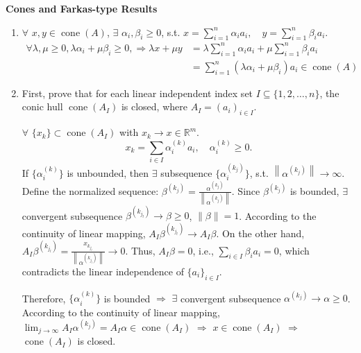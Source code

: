 \documentclass[11pt,letter,notitlepage]{article}
\theoremstyle{definition}
\begin{document}
\newpage

    \begin{solution}\textbf{Cones and Farkas-type Results}
        \begin{enumerate}[label=(\arabic*)]
            \item 
            $\forall$ $x,y \in \operatorname{cone}(A)$, $
            \exists$ $\alpha_i, \beta_i \geq 0$, s.t. $x = \sum_{i=1}^n \alpha_i a_i, \quad y = \sum_{i=1}^n \beta_i a_i$.
            \begin{align*}
            \forall \lambda, \mu \geq 0,
            \lambda \alpha_i + \mu \beta_i \geq 0,
            \Longrightarrow
            \lambda x + \mu y
            &=
            \lambda \sum_{i=1}^n \alpha_i a_i + \mu \sum_{i=1}^n \beta_i a_i\\
            &=
            \sum_{i=1}^n (\lambda \alpha_i + \mu \beta_i) a_i \in \operatorname{cone}(A)
            \end{align*}
            \item 
            First, prove that for each linear independent index set $I \subseteq \{1,2,\ldots,n\}$, the conic hull $\operatorname{cone}(A_I)$ is closed, where $A_I = (a_i)_{i \in I}$.

            $\forall$ $\{x_k\} \subset \operatorname{cone}(A_I)$ with $x_k \to x \in \mathbb{R}^m$.
            \[
            x_k = \sum_{i \in I} \alpha_{i}^{(k)} a_i, \quad \alpha_{i}^{(k)} \geq 0.
            \]
            If $\{\alpha_{i}^{(k)}\}$ is unbounded, then $\exists$ subsequence $\{\alpha_{i}^{(k_j)}\}$, s.t. $\left\|\alpha^{(k_j)}\right\| \to \infty$. Define the normalized sequence: $\beta^{(k_j)} = \frac{\alpha^{(k_j)}}{\left\|\alpha^{(k_j)}\right\|}$. Since $\beta^{(k_j)}$ is bounded, $\exists$ convergent subsequence $\beta^{(k_{j_l})} \to \beta \geq 0$, $\|\beta\| = 1$. According to the continuity of linear mapping, $A_I \beta^{(k_{j_l})} \to A_I \beta$. On the other hand, $A_I \beta^{(k_{j_l})} = \frac{x_{k_{j_l}}}{\left\|\alpha^{(k_{j_l})}\right\|} \to 0$. Thus, $A_I \beta = 0$, i.e., $\sum_{i \in I} \beta_i a_i = 0$, which contradicts the linear independence of $\{a_i\}_{i \in I}$.
            
            Therefore, $\{\alpha_{i}^{(k)}\}$ is bounded $\Longrightarrow$ $\exists$ convergent subsequence $\alpha^{(k_j)} \to \alpha \geq 0$. According to the continuity of linear mapping, $\lim_{j \to \infty} A_I \alpha^{(k_j)} = A_I \alpha \in \operatorname{cone}(A_I)$ $\Longrightarrow$ $x \in \operatorname{cone}(A_I)$ $\Longrightarrow$ $\operatorname{cone}(A_I)$ is closed.


\end{enumerate}
\end{solution}
\end{document}
